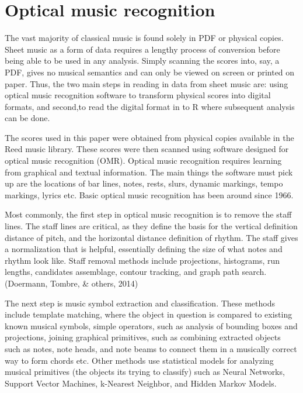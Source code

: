 \documentclass[12pt,twoside]{reedthesis}
\theoremstyle{definition}
\theoremstyle{definition}
\theoremstyle{definition}
\theoremstyle{remark}
\begin{document}
\section{Optical music recognition}\label{optical-music-recognition}

The vast majority of classical music is found solely in PDF or physical
copies. Sheet music as a form of data requires a lengthy process of
conversion before being able to be used in any analysis. Simply scanning
the scores into, say, a PDF, gives no musical semantics and can only be
viewed on screen or printed on paper. Thus, the two main steps in
reading in data from sheet music are: using optical music recognition
software to transform physical scores into digital formats, and
second,to read the digital format in to R where subsequent analysis can
be done.

The scores used in this paper were obtained from physical copies
available in the Reed music library. These scores were then scanned
using software designed for optical music recognition (OMR). Optical
music recognition requires learning from graphical and textual
information. The main things the software must pick up are the locations
of bar lines, notes, rests, slurs, dynamic markings, tempo markings,
lyrics etc. Basic optical music recognition has been around since 1966.

Most commonly, the first step in optical music recognition is to remove
the staff lines. The staff lines are critical, as they define the basis
for the vertical definition distance of pitch, and the horizontal
distance definition of rhythm. The staff gives a normalization that is
helpful, essentially defining the size of what notes and rhythm look
like. Staff removal methods include projections, histograms, run
lengths, candidates assemblage, contour tracking, and graph path search.
(Doermann, Tombre, \& others, 2014)

The next step is music symbol extraction and classification. These
methods include template matching, where the object in question is
compared to existing known musical symbols, simple operators, such as
analysis of bounding boxes and projections, joining graphical
primitives, such as combining extracted objects such as notes, note
heads, and note beams to connect them in a musically correct way to form
chords etc. Other methods use statistical models for analyzing musical
primitives (the objects its trying to classify) such as Neural Networks,
Support Vector Machines, k-Nearest Neighbor, and Hidden Markov Models.
\end{document}
